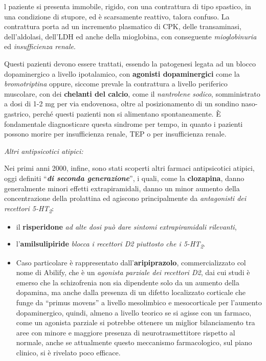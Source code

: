 \begin{itemize}
l paziente si presenta immobile, rigido, con una contrattura di tipo
spastico, in una condizione di stupore, ed è scarsamente reattivo,
talora confuso. La contrattura porta ad un incremento plasmatico di CPK,
delle transaminasi, dell'aldolasi, dell'LDH ed anche della mioglobina,
con conseguente \emph{mioglobinuria} ed \emph{insufficienza renale}.

Questi pazienti devono essere trattati, essendo la patogenesi legata ad
un blocco dopaminergico a livello ipotalamico, con \textbf{agonisti
dopaminergici} come la \emph{bromotriptina} oppure, siccome prevale la
contrattura a livello periferico muscolare, con dei \textbf{chelanti del
calcio}, come il \emph{nantrolene sodico}, somministrato a dosi di 1-2
mg per via endovenosa, oltre al posizionamento di un sondino
naso-gastrico, perché questi pazienti non si alimentano spontaneamente.
È fondamentale diagnosticare questa sindrome per tempo, in quanto i
pazienti possono morire per insufficienza renale, TEP o per
insufficienza renale.
\end{itemize}

\emph{\emph{Altri antipsicotici atipici:}}

Nei primi anni 2000, infine, sono stati scoperti altri farmaci
antipsicotici atipici, oggi definiti ``\textbf{\emph{di seconda
generazione}}'', i quali, come la \textbf{clozapina}, danno generalmente
minori effetti extrapiramidali, danno un minor aumento della
concentrazione della prolattina ed agiscono principalmente da
\emph{antagonisti dei recettori 5-HT\textsubscript{2}}:

\begin{itemize}
\item
  il \textbf{risperidone} \emph{ad alte dosi può dare sintomi
  extrapiramidali rilevanti},
\item
  l'\textbf{amilsulipiride} \emph{blocca i recettori D2 piuttosto che i
  5-HT\textsubscript{2}}.
\item
  Caso particolare è rappresentato dall'\textbf{aripiprazolo},
  commercializzato col nome di Abilify, che è un \emph{agonista parziale
  dei recettori D2}, dai cui studi è emerso che la schizofrenia non sia
  dipendente solo da un aumento della dopamina, ma anche dalla presenza
  di un difetto localizzato corticale che funge da ``primus movens'' a
  livello mesolimbico e mesocorticale per l'aumento dopaminergico,
  quindi, almeno a livello teorico se si agisse con un farmaco, come un
  agonista parziale si potrebbe ottenere un miglior bilanciamento tra
  aree con minore e maggiore presenza di neurotrasmettitore rispetto al
  normale, anche se attualmente questo meccanismo farmacologico, sul
  piano clinico, si è rivelato poco efficace.
\end{itemize}

